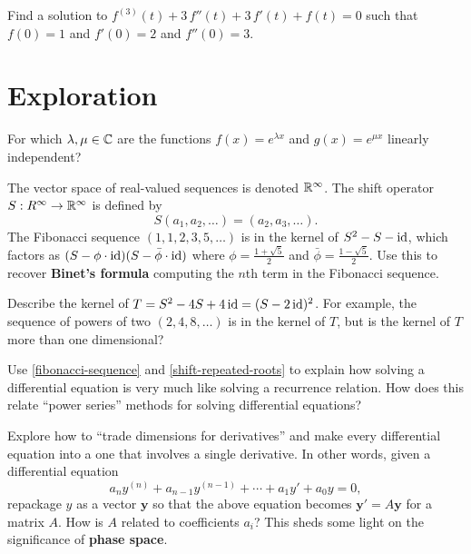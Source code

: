 \documentclass{homework}
\begin{document}
\begin{problem}
  Find a solution to $f^{(3)}(t) + 3 \, f''(t) + 3 \, f'(t) + f(t) = 0$ such that $f(0) = 1$ and $f'(0) = 2$ and $f''(0) = 3$.
\end{problem}

\section{Exploration}

\begin{problem}
  For which $\lambda, \mu \in \mathbb{C}$ are the functions $f(x) = e^{\lambda x}$ and $g(x) = e^{\mu x}$ linearly independent?
\end{problem}

\begin{problem}\label{fibonacci-sequence}The vector space of real-valued sequences is denoted $\mathbb{R}^\infty$.
  The shift operator $S : R^\infty \to \mathbb{R}^\infty$ is defined by
  \[
    S(a_1,a_2,\ldots) = (a_2,a_3,\ldots).
  \]
  The Fibonacci sequence $(1,1,2,3,5,\ldots)$ is in the kernel of $S^2 - S - \operatorname{id}$, which factors as $(S- \phi \cdot \operatorname{id})(S - \bar{\phi} \cdot \operatorname{id})$ where $\phi = \frac{1+\sqrt{5}}{2}$ and $\bar{\phi} = \frac{1-\sqrt{5}}{2}$.  Use this to recover \textbf{Binet's formula} computing the $n$th term in the Fibonacci sequence.  
\end{problem}

\begin{problem}\label{shift-repeated-roots}Describe the kernel of $T = S^2 - 4S + 4\operatorname{id} = (S-2\operatorname{id})^2$.  For
  example, the sequence of powers of two $(2,4,8,\ldots)$ is in the
  kernel of $T$, but is the kernel of $T$ more than one dimensional?
\end{problem}

\begin{problem}
  Use \ref{fibonacci-sequence} and \ref{shift-repeated-roots} to
  explain how solving a differential equation is very much like
  solving a recurrence relation.  How does this relate ``power
  series'' methods for solving differential equations?
\end{problem}

\begin{problem}\label{introduction-phase-space}Explore how to ``trade dimensions for derivatives'' and make every differential equation into a one that involves a single derivative.  In other words, given a differential equation
  \[
    a_n y^{(n)} + a_{n-1} y^{(n-1)} + \cdots + a_1 y' + a_0 y  = 0,
  \]
  repackage $y$ as a vector $\textbf{y}$ so that the above equation becomes $\textbf{y}' = A \textbf{y}$ for a matrix $A$.  How is $A$ related to coefficients $a_i$?  This sheds some light on the significance of \textbf{phase space}.
\end{problem}
\end{document}
